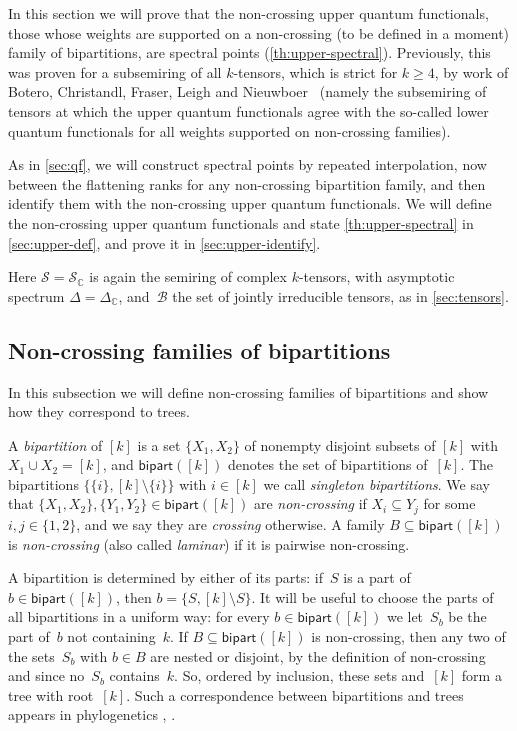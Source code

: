 \documentclass[11pt,letterpaper]{article}
\newcommand{\bipart}{\mathsf{bipart}}
\newcommand{\CC}{\mathbb{C}}
\begin{document}
In this section we will prove that the non-crossing upper quantum functionals, those whose weights are supported on a non-crossing (to be defined in a moment) family of bipartitions, are spectral points (\cref{th:upper-spectral}). Previously, this was proven for a subsemiring of all $k$-tensors, which is strict for $k \geq 4$, by work of Botero, Christandl, Fraser, Leigh and Nieuwboer~\cite[Proposition~4.2 and Theorem~3.1]{botero2026quantumfunctionalshigherordertensors} (namely the subsemiring of tensors at which the upper quantum functionals agree with the so-called lower quantum functionals \cite[Definition~3.3]{MR4495838} for all weights supported on non-crossing families). 

As in \cref{sec:qf}, we will construct spectral points by repeated interpolation, now between the flattening ranks for any non-crossing bipartition family, and then identify them with the non-crossing upper quantum functionals. We will define the non-crossing upper quantum functionals and state \cref{th:upper-spectral} in \cref{sec:upper-def}, and prove it in \cref{sec:upper-identify}.

Here $\mathcal{S} = \mathcal{S}_\CC$ is again the semiring of complex $k$-tensors, with asymptotic spectrum $\Delta = \Delta_\CC$, and~$\mathcal{B}$ the set of jointly irreducible tensors, as in \cref{sec:tensors}.

\subsection{Non-crossing families of bipartitions}\label{sec:upper-noncrossing}

In this subsection we will define non-crossing families of bipartitions and show how they correspond to trees.

A \emph{bipartition} of $[k]$ is a set $\{X_1, X_2\}$ of nonempty disjoint subsets of $[k]$ with $X_1 \cup X_2 = [k]$, and $\bipart([k])$ denotes the set of bipartitions of~$[k]$. The bipartitions $\{\{i\}, [k] \setminus \{i\}\}$ with $i \in [k]$ we call \emph{singleton bipartitions}. We say that $\{X_1, X_2\}, \{Y_1, Y_2\} \in \bipart([k])$ are \emph{non-crossing} if $X_i \subseteq Y_j$ for some $i, j \in \{1, 2\}$, and we say they are  \emph{crossing} otherwise. A family $B \subseteq \bipart([k])$ is \emph{non-crossing} (also called \emph{laminar}) if it is pairwise non-crossing.

A bipartition is determined by either of its parts: if~$S$ is a part of $b \in \bipart([k])$, then $b = \{S, [k] \setminus S\}$. It will be useful to choose the parts of all bipartitions in a uniform way: for every $b \in \bipart([k])$ we let~$S_b$ be the part of~$b$ not containing~$k$. If $B \subseteq \bipart([k])$ is non-crossing, then any two of the sets~$S_b$ with $b \in B$ are nested or disjoint, by the definition of non-crossing and since no~$S_b$ contains~$k$. So, ordered by inclusion, these sets and~$[k]$ form a tree with root~$[k]$. Such a correspondence between bipartitions and trees appears in phylogenetics \cite[Lemmas~3 and~5]{buneman1971recovery}, \cite[Theorem~3.1.4, Proposition~3.5.4 and Theorem~3.5.2]{MR2060009}.
\end{document}
